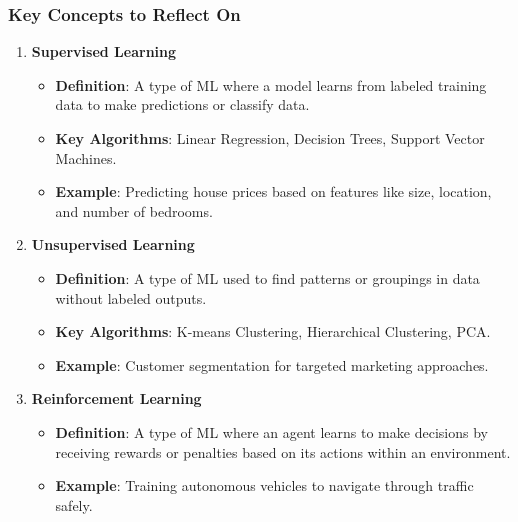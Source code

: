 \documentclass[aspectratio=169]{beamer}
\begin{document}
\begin{frame}[fragile]
    \frametitle{Key Concepts to Reflect On}
    \begin{enumerate}
        \item \textbf{Supervised Learning}
        \begin{itemize}
            \item \textbf{Definition}: A type of ML where a model learns from labeled training data to make predictions or classify data.
            \item \textbf{Key Algorithms}: Linear Regression, Decision Trees, Support Vector Machines.
            \item \textbf{Example}: Predicting house prices based on features like size, location, and number of bedrooms.
        \end{itemize}
        
        \item \textbf{Unsupervised Learning}
        \begin{itemize}
            \item \textbf{Definition}: A type of ML used to find patterns or groupings in data without labeled outputs.
            \item \textbf{Key Algorithms}: K-means Clustering, Hierarchical Clustering, PCA.
            \item \textbf{Example}: Customer segmentation for targeted marketing approaches.
        \end{itemize}
        
        \item \textbf{Reinforcement Learning}
        \begin{itemize}
            \item \textbf{Definition}: A type of ML where an agent learns to make decisions by receiving rewards or penalties based on its actions within an environment.
            \item \textbf{Example}: Training autonomous vehicles to navigate through traffic safely.
        \end{itemize}
    \end{enumerate}
\end{frame}
\end{document}
